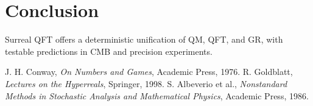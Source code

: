 \documentclass{article}
\begin{document}
\section{Conclusion}
Surreal QFT offers a deterministic unification of QM, QFT, and GR, with testable predictions in CMB and precision experiments.

\begin{thebibliography}{9}
J. H. Conway, \emph{On Numbers and Games}, Academic Press, 1976.
R. Goldblatt, \emph{Lectures on the Hyperreals}, Springer, 1998.
S. Albeverio et al., \emph{Nonstandard Methods in Stochastic Analysis and Mathematical Physics}, Academic Press, 1986.
\end{thebibliography}
\end{document}
